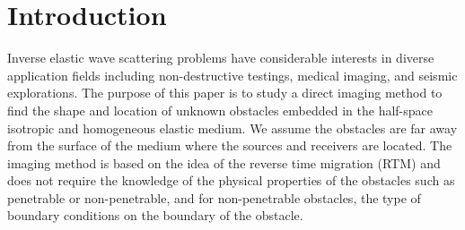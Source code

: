 \documentclass[12pt]{iopart}
\begin{document}
\newcommand{\N}{\mathbb{N}}
\newcommand{\D}{\mathbb{D}}
\newcommand{\T}{\mathbb{T}}
\newcommand{\A}{\mathbb{A}}
\newcommand{\B}{\mathbb{B}}
\newcommand{\G}{\mathbb{G}}
\newcommand{\F}{\mathbb{F}}
\newcommand{\R}{\mathbb{R}}
\newcommand{\W}{\mathbb{W}}
\newcommand{\V}{\mathbb{V}}
\newcommand{\U}{\mathbb{U}}
\newcommand{\J}{\mathbb{J}}
\newcommand{\Zg}{\mathbb{Z}}
\newcommand{\Gtheta}{\mathbb{\Theta}}
\newcommand{\Gphi}{\mathbb{\Phi}}

\newcommand{\be}{\begin{eqnarray}}
\newcommand{\ee}{\end{eqnarray}}
\newcommand{\ben}{\begin{eqnarray*}}
	\newcommand{\een}{\end{eqnarray*}}
\newcommand{\nn}{\nonumber}

\section{Introduction}\label{section1}

Inverse elastic wave scattering problems have considerable interests in diverse application fields including non-destructive testings, medical imaging, and seismic explorations. The purpose of this paper is to study a direct imaging method to find
the shape and location of unknown obstacles embedded in the half-space isotropic and homogeneous elastic medium. We assume the obstacles are far away from the surface of the medium where the sources and receivers are located. The imaging method is
based on the idea of the reverse time migration (RTM) and does not require the knowledge of 
the physical properties of the obstacles such as penetrable or non-penetrable, and for non-penetrable obstacles, the type of boundary conditions on the boundary of the obstacle.
\end{document}
